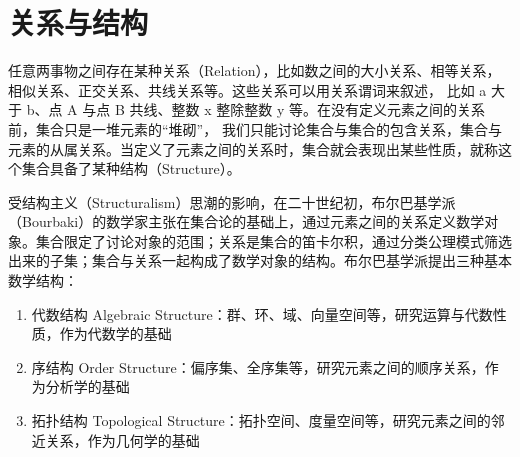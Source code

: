 \chapter{关系与结构}

任意两事物之间存在某种关系（Relation），比如数之间的大小关系、相等关系，相似关系、正交关系、共线关系等。这些关系可以用关系谓词来叙述，
比如 a 大于 b、点 A 与点 B 共线、整数 x 整除整数 y 等。在没有定义元素之间的关系前，集合只是一堆元素的“堆砌”，
我们只能讨论集合与集合的包含关系，集合与元素的从属关系。当定义了元素之间的关系时，集合就会表现出某些性质，就称这个集合具备了某种结构（Structure）。
\vspace{1em}

受结构主义（Structuralism）思潮的影响，在二十世纪初，布尔巴基学派（Bourbaki）的数学家主张在集合论的基础上，通过元素之间的关系定义数学对象。集合限定了讨论对象的范围；关系是集合的笛卡尔积，通过分类公理模式筛选出来的子集；集合与关系一起构成了数学对象的结构。布尔巴基学派提出三种基本数学结构：
\begin{enumerate}
    \item 代数结构 Algebraic Structure：群、环、域、向量空间等，研究运算与代数性质，作为代数学的基础
    \item 序结构 Order Structure：偏序集、全序集等，研究元素之间的顺序关系，作为分析学的基础
    \item 拓扑结构 Topological Structure：拓扑空间、度量空间等，研究元素之间的邻近关系，作为几何学的基础
\end{enumerate}
\newpage